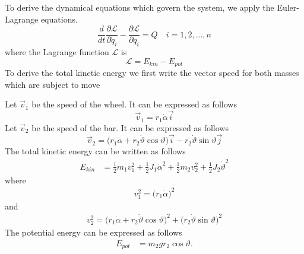 \documentclass[12pt,a4paper,oneside]{book}
\begin{document}
\begin{onehalfspace}
To derive the dynamical equations which govern the system, we apply the 
Euler-Lagrange equations.   
\begin{equation}\label{segway_eq_1}
	\frac{d}{dt}\frac{\partial \mathcal{L}}{\partial \dot{q}_i} - 
	\frac{\partial \mathcal{L}}{\partial q_i} = Q\quad i=1,2,\dots,n
\end{equation}
where the Lagrange function $\mathcal{L}$ is
\begin{equation}\label{segway_eq_2}
	\mathcal{L}=E_{kin}-E_{pot}
\end{equation}
To derive the total kinetic energy we first write the vector speed for both 
masses which are subject to move

Let $\vec{v}_1$ be the speed of the wheel. It can be expressed as follows
\begin{equation}\label{segway_eq_3}
	\vec{v}_1 = r_1\dot{\alpha}\vec{i}
\end{equation}
Let $\vec{v}_2$ be the speed of the bar. It can be expressed as follows
\begin{equation}\label{segway_eq_4}
	\vec{v}_2 = \Big(r_1\dot{\alpha} + 
	r_2\dot{\vartheta}\cos\vartheta\Big)\vec{i}- 
	r_2\dot{\vartheta}\sin\vartheta\vec{j}
\end{equation}
The total kinetic energy can be written as follows
\begin{equation}\label{segway_eq_5}
	\begin{aligned}
		E_{kin}&=\frac{1}{2}m_1v_1^2+\frac{1}{2}J_1\dot{\alpha}^2+
		\frac{1}{2}m_2v_2^2+\frac{1}{2}J_2\dot{\vartheta}^2
	\end{aligned}
\end{equation}
where 
\begin{equation}\label{segway_eq_5}
	\begin{aligned}
		v_1^2 = \big(r_1\dot{\alpha}\big)^2
	\end{aligned}
\end{equation}
and
\begin{equation}\label{segway_eq_5}
	\begin{aligned}
		v_2^2 = \big(r_1\dot{\alpha} + 
		r_2\dot{\vartheta}\cos\vartheta\big)^2+\big(r_2\dot{\vartheta}\sin\vartheta\big)^2
	\end{aligned}
\end{equation}
The potential energy can be expressed as follows
\begin{equation}\label{segway_eq_6}
	\begin{aligned}
		E_{pot}&=m_2gr_2\cos\vartheta.
	\end{aligned}

\end{equation}
\end{onehalfspace}
\end{document}
